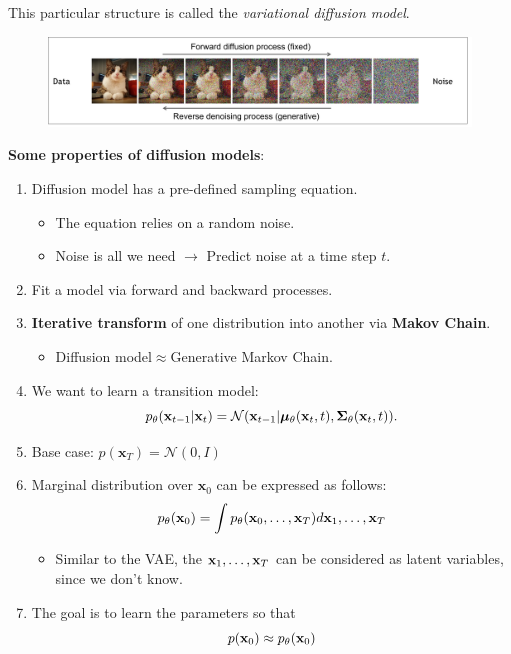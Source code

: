 This particular structure is called the \textit{variational diffusion model}.
\begin{figure}[t]
	\centering
	\includegraphics[scale=0.28]{./images/diffusion/diffusion_model.png}
	\caption{\href{https://cvpr2022-tutorial-diffusion-models.github.io/}{\tiny {}}}
\end{figure}

\textbf{Some properties of diffusion models}:
\begin{enumerate}
	\item Diffusion model has a pre-defined sampling equation.
		\begin{itemize}
			\item The equation relies on a random noise.
			\item Noise is all we need $\to$ Predict noise at a time step $t$.
		\end{itemize}
	\item Fit a model via forward and backward processes.
	\item \textbf{Iterative transform} of one distribution into another via \textbf{Makov Chain}.
		\begin{itemize}
			\item Diffusion model$\approx$Generative Markov Chain.
		\end{itemize}
	\item We want to learn a transition model:
		$$p_\theta(\mathbf{x}_{t-1}|{\mathbf{x}}_t) = \mathcal{N}(\mathbf{x}_{t-1}|\boldsymbol{\mu}_{\theta}(\mathbf{x}_{t}, t), \boldsymbol{\Sigma}_\theta(\mathbf{x}_t,t)).$$
	\item Base case: $p(\mathbf{x}_T) = \mathcal{N}(0,I)$ 
	\item Marginal distribution over $\mathbf{x}_0$ can be expressed as follows:
		$$p_\theta(\mathbf{x}_0) = \int p_\theta({\mathbf{x}}_0,\dots,\mathbf{x}_T)d{\mathbf{x}}_1,\dots,{\mathbf{x}}_T$$
		\begin{itemize}
			\item Similar to the VAE, the ${\mathbf{x}}_1,\dots, {\mathbf{x}}_T$ can be considered as latent variables, since we don't know. 
		\end{itemize}
	\item The goal is to learn the parameters so that
		$$p({\mathbf{x}}_0)\approx p_\theta({\mathbf{x}}_0)$$
\end{enumerate}

